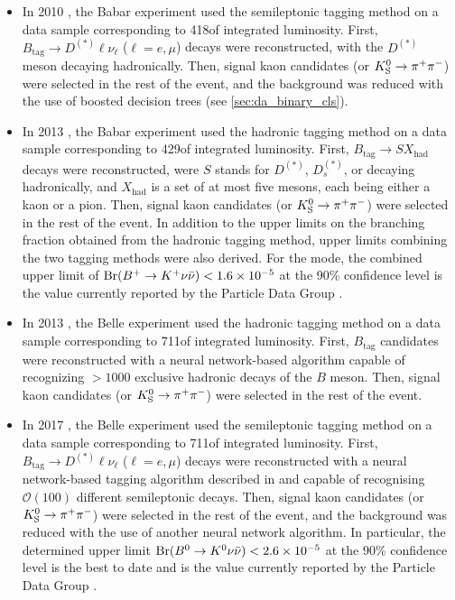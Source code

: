 \begin{itemize}
\item In 2010 \cite{BaBar:2010oqg}, the Babar experiment used the semileptonic tagging method on a data sample corresponding to 418\invfb of integrated luminosity.
First, $B_{\mathrm{tag}}\to D^{(*)}\ell\nu_\ell$ ($\ell=e,\mu$) decays were reconstructed, with the $D^{(*)}$ meson decaying hadronically.
Then, signal kaon candidates (\Kp or $K^0_{\mathrm{S}}\rightarrow\pi^+\pi^-$) were selected in the rest of the event, and the background was reduced with the use of boosted decision trees (see \cref{sec:da_binary_cls}).
\item In 2013 \cite{BaBar:2013npw}, the Babar experiment used the hadronic tagging method on a data sample corresponding to 429\invfb of integrated luminosity.
First, $B_{\mathrm{tag}}\to SX_{\mathrm{had}}$ decays were reconstructed, were $S$ stands for $D^{(*)}$, $D_s^{(*)}$, or \jpsi decaying hadronically, and $X_{\mathrm{had}}$ is a set of at most five mesons, each being either a kaon or a pion.
Then, signal kaon candidates (\Kp or $K^0_{\mathrm{S}}\rightarrow\pi^+\pi^-$) were selected in the rest of the event.
In addition to the upper limits on the branching fraction obtained from the hadronic tagging method, upper limits combining the two tagging methods were also derived.
For the \Kp mode, the combined upper limit of $\mathrm{Br}(B^+\rightarrow K^+\nu\bar{\nu})<1.6\times 10^{-5}$ at the 90\% confidence level is the value currently reported by the Particle Data Group \cite{ParticleDataGroup:2020ssz}.
\item In 2013 \cite{Belle:2013tnz}, the Belle experiment used the hadronic tagging method on a data sample corresponding to 711\invfb of integrated luminosity.
First, $B_{\mathrm{tag}}$ candidates were reconstructed with a neural network-based algorithm \cite{Feindt:2011mr} capable of recognizing $>1000$ exclusive hadronic decays of the $B$ meson.
Then, signal kaon candidates (\Kp or $K^0_{\mathrm{S}}\rightarrow\pi^+\pi^-$) were selected in the rest of the event.
\item In 2017 \cite{Belle:2017oht}, the Belle experiment used the semileptonic tagging method on a data sample corresponding to 711\invfb of integrated luminosity.
First, $B_{\mathrm{tag}}\to D^{(*)}\ell\nu_\ell$ ($\ell=e,\mu$) decays were reconstructed with a neural network-based tagging algorithm described in \autocite{Feindt:2011mr,Belle:2015odw} and capable of recognising $\mathcal{O}(100)$ different semileptonic decays.
Then, signal kaon candidates (\Kp or $K^0_{\mathrm{S}}\rightarrow\pi^+\pi^-$) were selected in the rest of the event, and the background was reduced with the use of another neural network algorithm.
In particular, the determined upper limit $\mathrm{Br}(B^0\rightarrow K^0\nu\bar{\nu})<2.6\times 10^{-5}$ at the 90\% confidence level is the best to date and is the value currently reported by the Particle Data Group \cite{ParticleDataGroup:2020ssz}.
\end{itemize}

